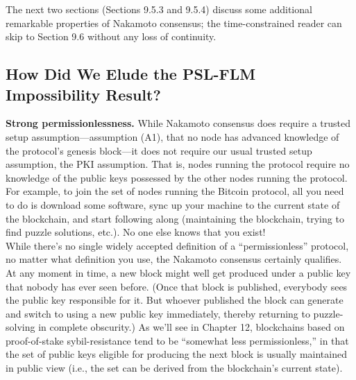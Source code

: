 The next two sections (Sections 9.5.3 and 9.5.4) discuss some additional remarkable properties
of Nakamoto consensus; the time-constrained reader can skip to Section 9.6 without any loss
of continuity.
\subsection{How Did We Elude the PSL-FLM Impossibility Result?}
\noindent
\textbf{Strong permissionlessness.} While Nakamoto consensus does require a trusted setup
assumption—assumption (A1), that no node has advanced knowledge of the protocol’s genesis
block—it does not require our usual trusted setup assumption, the PKI assumption. That
is, nodes running the protocol require no knowledge of the public keys possessed by the
other nodes running the protocol. For example, to join the set of nodes running the Bitcoin
protocol, all you need to do is download some software, sync up your machine to the current
state of the blockchain, and start following along (maintaining the blockchain, trying to find
puzzle solutions, etc.). No one else knows that you exist!\\
While there’s no single widely accepted definition of a “permissionless” protocol, no
matter what definition you use, the Nakamoto consensus certainly qualifies. At any moment
in time, a new block might well get produced under a public key that nobody has ever
seen before. (Once that block is published, everybody sees the public key responsible for
it. But whoever published the block can generate and switch to using a new public key
immediately, thereby returning to puzzle-solving in complete obscurity.) As we’ll see in
Chapter 12, blockchains based on proof-of-stake sybil-resistance tend to be “somewhat less
permissionless,” in that the set of public keys eligible for producing the next block is usually
maintained in public view (i.e., the set can be derived from the blockchain’s current state).\\


